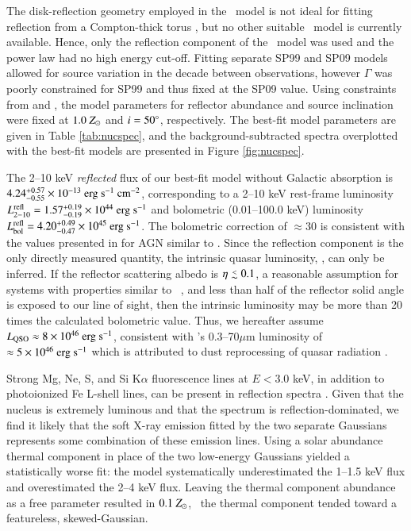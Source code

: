 \documentclass[referee,traditabstract]{aa}
\begin{document}
The disk-reflection geometry employed in the \pexrav\ model is not
ideal for fitting reflection from a Compton-thick torus
\citep{2009MNRAS.397.1549M}, but no other suitable \xspec\ model is
currently available. Hence, only the reflection component of the
\pexrav\ model was used and the power law had no high energy
cut-off. Fitting separate SP99 and SP09 models allowed for source
variation in the decade between observations, however $\Gamma$ was
poorly constrained for SP99 and thus fixed at the SP09 value. Using
constraints from \citet{1997A&A...318L...1T} and
\citet{2000AJ....120..562T}, the model parameters for reflector
abundance and source inclination were fixed at $1.0 ~Z_{\odot}$ and $i =
50\rm{^{\circ}}$, respectively. The best-fit model parameters are given in
Table \ref{tab:nucspec}, and the background-subtracted spectra
overplotted with the best-fit models are presented in Figure
\ref{fig:nucspec}.

The 2--10 keV {\it{reflected}} flux of our best-fit model without
Galactic absorption is $4.24^{+0.57}_{-0.55} \times 10^{-13} ~\rm{\mbox{\ensuremath{\rm{erg}}}~\ensuremath{\rm{\mbox{\ensuremath{\rm{s}}}^{-1}}}~\mbox{\ensuremath{\rm{cm^{-2}}}}}$,
corresponding to a 2--10 keV rest-frame luminosity
$L^{\rm{refl}}_{2-10} = 1.57^{+0.19}_{-0.19} \times 10^{44} ~\rm{\mbox{\ensuremath{\rm{erg}}}~\ensuremath{\rm{\mbox{\ensuremath{\rm{s}}}^{-1}}}}$ and
bolometric (0.01--100.0 keV) luminosity $L_{\rm{bol}}^{\rm{refl}} =
4.20^{+0.49}_{-0.47} \times 10^{45} ~\rm{\mbox{\ensuremath{\rm{erg}}}~\ensuremath{\rm{\mbox{\ensuremath{\rm{s}}}^{-1}}}}$. The bolometric correction
of $\approx 30$ is consistent with the values presented in
\citet{2007MNRAS.381.1235V} for AGN similar to \irs. Since the
reflection component is the only directly measured quantity, the
intrinsic quasar luminosity, \lqso, can only be inferred. If the
reflector scattering albedo is $\eta \la 0.1$, a reasonable assumption
for systems with properties similar to
\irs\ \citep{2009MNRAS.397.1549M}, and less than half of the reflector
solid angle is exposed to our line of sight, then the intrinsic
luminosity may be more than 20 times the calculated bolometric
value. Thus, we hereafter assume $L_{\rm{QSO}} \approx 8 \times 10^{46}
~\rm{\mbox{\ensuremath{\rm{erg}}}~\ensuremath{\rm{\mbox{\ensuremath{\rm{s}}}^{-1}}}}$, consistent with \irs's 0.3--70$\mu$m luminosity of $\approx 5
\times 10^{46} ~\rm{\mbox{\ensuremath{\rm{erg}}}~\ensuremath{\rm{\mbox{\ensuremath{\rm{s}}}^{-1}}}}$ which is attributed to dust reprocessing of
quasar radiation \citep[][H99]{1988ApJ...328..161K}.

Strong Mg, Ne, S, and Si K$\alpha$ fluorescence lines at $E < 3.0$
keV, in addition to photoionized Fe L-shell lines, can be present in
reflection spectra \citep{1990ApJ...362...90B,
  1991MNRAS.249..352G}. Given that the nucleus is extremely luminous
and that the spectrum is reflection-dominated, we find it likely that
the soft X-ray emission fitted by the two separate Gaussians
represents some combination of these emission lines. Using a solar
abundance thermal component in place of the two low-energy Gaussians
yielded a statistically worse fit: the model systematically
underestimated the 1--1.5 keV flux and overestimated the 2--4 keV
flux. Leaving the thermal component abundance as a free parameter
resulted in $0.1 ~Z_{\odot}$, \ie\ the thermal component tended toward a
featureless, skewed-Gaussian.
\end{document}

